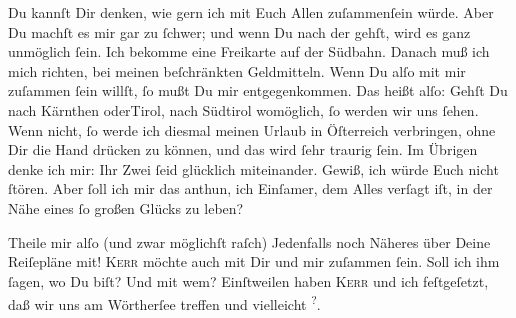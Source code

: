\pstart
           Du kannſt Dir denken, wie gern ich mit Euch Allen zuſammenſein würde. Aber Du machſt
               es mir gar zu ſchwer; und wenn Du nach der \label{K_L03071-1v}\label{K_L03071-1} gehſt, wird es
               ganz unmöglich{ }ſein. Ich bekomme eine Freikarte auf der Südbahn. Danach muß ich mich richten, bei meinen beſchränkten
               Geldmitteln. Wenn Du alſo mit mir {\pb}zuſammen{ }ſein
               willſt,{ }ſo mußt Du mir entgegenkommen. Das heißt alſo: Gehſt Du nach \introOben{}Kärnthen oder\introOben{}{ }Tirol, nach Südtirol womöglich,{ }ſo werden wir uns{ }ſehen. Wenn  nicht,{ }ſo werde ich diesmal meinen Urlaub in Öſterreich verbringen, ohne Dir die Hand drücken zu können, und das wird{ }ſehr traurig{ }ſein. Im Übrigen denke ich mir: Ihr Zwei{ }ſeid glücklich miteinander.
               Gewiß, ich würde Euch nicht{ }ſtören. Aber{ }ſoll ich mir das anthun, ich Einſamer, {\pb}dem Alles verſagt iſt, in der Nähe eines{ }ſo großen
               Glücks zu leben?\pend
           
\pstart
           Theile mir alſo \introOben{}(und zwar möglichſt raſch)\introOben{}{ } Jedenfalls noch Näheres über Deine Reiſepläne mit! \textsc{Kerr} möchte auch mit Dir und mir zuſammen{ }ſein. Soll ich ihm{ }ſagen, wo Du biſt? Und
               mit wem? Einſtweilen haben \textsc{Kerr} und ich feſtgeſetzt, daß wir uns am Wörtherſee treffen und vielleicht \label{K_L03071-2v}\label{K_L03071-2}\substVorne{}\textsuperscript{?}\substDazwischen{}.\substHinten{}\pend
           
